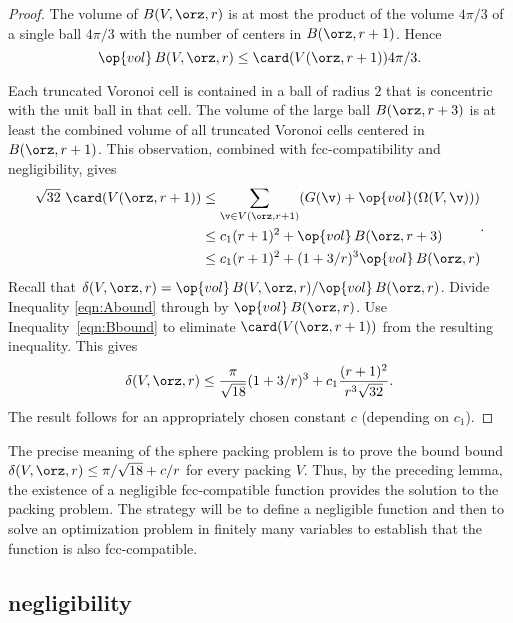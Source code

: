 \begin{proof}
The volume of $B( V,\orz,r)$ is at most the product of the volume
$4\pi/3$ of a single ball $4\pi/3$ with the number of centers in
$B(\orz,r+1)$.  Hence
\begin{equation}
\op{vol}\, B( V,\orz,r) \le \card( V(\orz,r+1)) 4\pi/3.
\label{eqn:Abound}
\end{equation}

Each truncated Voronoi cell is contained in a ball of
radius $2$ that is concentric with the unit ball in that cell.  The volume
of the large ball $B(\orz,r+3)$ is at least the combined volume of 
all truncated Voronoi
cells centered in $B(\orz,r+1)$. This observation,
combined with fcc-compatibility and negligibility, gives
\begin{equation}
\begin{split}
\sqrt{32}\,\,\card( V(\orz,r+1))
&\le \sum_{\v\in V(\orz,r+1)} (G(\v) +
\op{vol}(\Omega(V,\v))) \\
&\le c_1 (r+1)^2 + \op{vol}\,B(\orz,r+3) \\
&\le c_1 (r+1)^2 + (1+3/r)^3 \op{vol}\,B(\orz,r)
\label{eqn:Bbound}
\end{split}.
\end{equation}
%
Recall that $\delta( V,\orz,r)=
\op{vol}\,B( V,\orz,r)/\op{vol}\,B(\orz,r)$. Divide Inequality
\ref{eqn:Abound} through by $\op{vol}\,B(\orz,r)$.  Use
Inequality~\ref{eqn:Bbound} to eliminate $\card( V(\orz,r+1))$ from the
resulting inequality.  This gives
\begin{displaymath}\delta( V,\orz,r)
\le \frac{\pi}{\sqrt{18}} (1+3/r)^3 + c_1 \frac{(r+1)^2}{r^3\sqrt{32}}.
\end{displaymath}
The result follows for an appropriately chosen constant $c$
(depending on $c_1$).
\end{proof}

\begin{remark} \label{remark:precise} The precise meaning of the
sphere packing problem is to prove the bound bound $\delta( V,\orz,r)
\le \pi/\sqrt{18} + c/r$ for every packing $ V$.  Thus, by the
preceding lemma, the existence of a negligible fcc-compatible
function provides the solution to the packing problem.  The strategy
will be to define a negligible function and then to solve an
optimization problem in finitely many variables to establish that
the function is also fcc-compatible.
\end{remark}


\subsection{negligibility}

